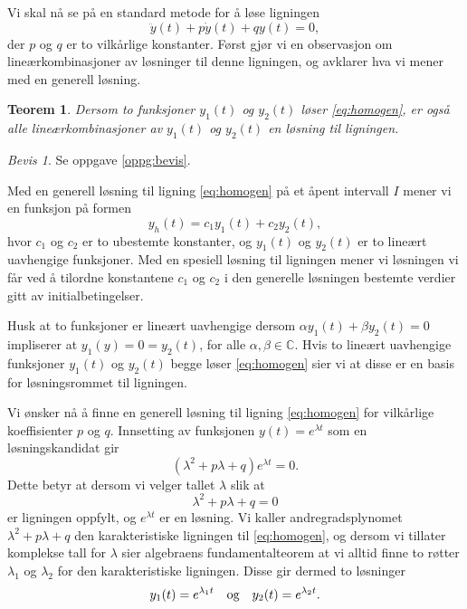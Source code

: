 \documentclass{article}
\newtheorem{thm}{Teorem}\surroundwithmdframed{thm}
\theoremstyle{definition}
\theoremstyle{remark}
\newtheorem*{bevis}{Bevis}
\newenvironment{defn}
{\pushQED{\qed}\renewcommand{\qedsymbol}{$\triangle$}\defnx}
{\popQED\enddefnx}
\begin{document}
\begin{multicols*}{2}
Vi skal nå se på en standard metode for å løse ligningen
\begin{equation} \label{eq:homogen}
    \ddot{y}(t) + p \dot{y}(t) + q y(t) = 0,
\end{equation}
der $p$ og $q$ er to vilkårlige konstanter. Først gjør vi en observasjon om lineærkombinasjoner av løsninger til denne ligningen, og avklarer hva vi mener med en generell løsning.

\begin{thm} \label{thm:lin_komb_losning}
  Dersom to funksjoner $y_1(t)$ og $y_2(t)$ løser \eqref{eq:homogen}, er også alle lineærkombinasjoner av $y_1(t)$ og $y_2(t)$ en løsning til ligningen.
\end{thm}

\begin{bevis}
  Se oppgave \ref{oppg:bevis}.
\end{bevis}

\begin{defn}
    Med en generell løsning til ligning \eqref{eq:homogen} på et åpent intervall $I$ mener vi en funksjon på formen
    \begin{equation*}
      y_h(t) = c_1 y_1(t) + c_2 y_2(t),
    \end{equation*}
    hvor $c_1$ og $c_2$ er to ubestemte konstanter, og $y_1(t)$ og $y_2(t)$ er to lineært uavhengige funksjoner. Med en spesiell løsning til ligningen mener vi løsningen vi får ved å tilordne konstantene $c_1$ og $c_2$ i den generelle løsningen bestemte verdier gitt av initialbetingelser.
\end{defn}

Husk at to funksjoner er lineært uavhengige dersom $\alpha y_1(t) + \beta y_2(t) = 0$ impliserer at $y_1(y) = 0 = y_2(t)$, for alle $\alpha, \beta \in \mathbb{C}$. Hvis to lineært uavhengige funksjoner $y_1(t)$ og $y_2(t)$ begge løser \eqref{eq:homogen} sier vi at disse er en basis for løsningsrommet til ligningen.

Vi ønsker nå å finne en generell løsning til ligning \eqref{eq:homogen} for vilkårlige koeffisienter $p$ og $q$. Innsetting av funksjonen $y(t) = e^{\lambda t}$ som en løsningskandidat gir
\begin{equation*}
  (\lambda^2 + p \lambda + q) e^{\lambda t} = 0.
\end{equation*}
Dette betyr at dersom vi velger tallet $\lambda$ slik at
\begin{equation*}
  \lambda^2 + p \lambda + q = 0  
\end{equation*}
er ligningen oppfylt, og $e^{\lambda t}$ er en løsning. Vi kaller andregradsplynomet $\lambda^2 + p \lambda + q$ den karakteristiske ligningen til \eqref{eq:homogen}, og dersom vi tillater komplekse tall for $\lambda$ sier algebraens fundamentalteorem at vi alltid finne to røtter $\lambda_1$ og $\lambda_2$ for den karakteristiske ligningen. Disse gir dermed to løsninger
\begin{equation*}
  y_1(t) = e^{\lambda_1 t}\ \ \textnormal{ og }\ \ y_2(t) = e^{\lambda_2 t}.
\end{equation*}


\end{multicols*}
\end{document}
